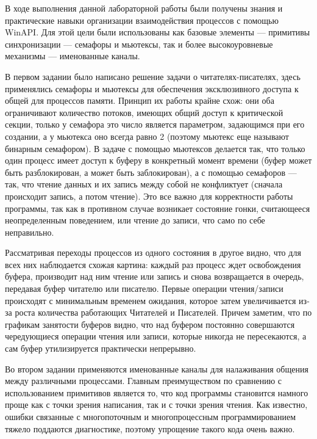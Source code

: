 \documentclass[a4paper,14pt]{extarticle}
\begin{document}
\clearpage


В ходе выполнения данной лабораторной работы были получены знания и
практические навыки организации взаимодействия процессов с помощью WinAPI. Для
этой цели были использованы как базовые элементы --- примитивы синхронизации
--- семафоры и мьютексы, так и более высокоуровневые механизмы --- именованные
каналы.

В первом задании было написано решение задачи о читателях-писателях, здесь
применялись семафоры и мьютексы для обеспечения эксклюзивного доступа к общей
для процессов памяти. Принцип их работы крайне схож: они оба ограничивают
количество потоков, имеющих общий доступ к критической секции, только у
семафора это число является параметром, задающимся при его создании, а у
мьютекса оно всегда равно 2 (поэтому мьютекс еще называют бинарным семафором).
В задаче с помощью мьютексов делается так, что только один процесс имеет доступ
к буферу в конкретный момент времени (буфер может быть разблокирован, а может
быть заблокирован), а с помощью семафоров --- так, что чтение данных и их запись
между собой не конфликтует (сначала происходит запись, а потом чтение). Это
все важно для корректности работы программы, так как в противном случае возникает
состояние гонки, считающееся неопределенным поведением, или чтение до записи,
что само по себе неправильно.

Рассматривая переходы процессов из одного состояния в другое видно, что для
всех них наблюдается схожая картина: каждый раз процесс ждет освобождения
буфера, производит над ним чтение или запись и снова возвращается в очередь,
передавая буфер читателю или писателю. Первые операции чтения/записи происходят
с минимальным временем ожидания, которое затем увеличивается из-за роста
количества работающих Читателей и Писателей. Причем заметим, что по графикам
занятости буферов видно, что над буфером постоянно совершаются чередующиеся
операции чтения или записи, которые никогда не пересекаются, а сам буфер
утилизируется практически непрерывно.

Во втором задании применяются именованные каналы для налаживания общения между
различными процессами. Главным преимуществом по сравнению с использованием
примитивов является то, что код программы становится намного проще как с точки
зрения написания, так и с точки зрения чтения. Как известно, ошибки связанные с
многопоточным и многопроцессным программированием тяжело поддаются диагностике,
поэтому упрощение такого кода очень важно.
\end{document}
